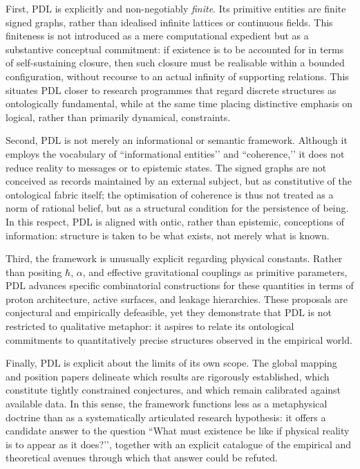 \documentclass{article}
\theoremstyle{definition}
\newcommand{\PDL}{\ensuremath{\mathrm{PDL}}}
\begin{document}
First, \PDL{} is explicitly and non-negotiably \emph{finite}. Its primitive entities are finite signed graphs, rather than idealised infinite lattices or continuous fields.%
\cite{PDL_Main_2026,PDL_Minimal_Closures_2026}
This finiteness is not introduced as a mere computational expedient but as a substantive conceptual commitment: if existence is to be accounted for in terms of self-sustaining closure, then such closure must be realisable within a bounded configuration, without recourse to an actual infinity of supporting relations. This situates \PDL{} closer to research programmes that regard discrete structures as ontologically fundamental, while at the same time placing distinctive emphasis on logical, rather than primarily dynamical, constraints.

Second, \PDL{} is not merely an informational or semantic framework.
Although it employs the vocabulary of “informational entities’’ and “coherence,’’ it does not reduce reality to messages or to epistemic states.
The signed graphs are not conceived as records maintained by an external subject, but as constitutive of the ontological fabric itself; the optimisation of coherence is thus not treated as a norm of rational belief, but as a structural condition for the persistence of being.%
\cite{PDL_Main_2026,PDL_Position_2026}
In this respect, \PDL{} is aligned with ontic, rather than epistemic, conceptions of information: structure is taken to be what exists, not merely what is known.

Third, the framework is unusually explicit regarding physical constants.
Rather than positing \(\hbar\), \(\alpha\), and effective gravitational couplings as primitive parameters, \PDL{} advances specific combinatorial constructions for these quantities in terms of proton architecture, active surfaces, and leakage hierarchies.%
\cite{PDL_Alpha_2026_v2,PDL_Exponent18_2026_Refined,PDL_Effective_Fields_2026}
These proposals are conjectural and empirically defeasible, yet they demonstrate that \PDL{} is not restricted to qualitative metaphor: it aspires to relate its ontological commitments to quantitatively precise structures observed in the empirical world.

Finally, \PDL{} is explicit about the limits of its own scope.
The global mapping and position papers delineate which results are rigorously established, which constitute tightly constrained conjectures, and which remain calibrated against available data.%
\cite{PDL_Position_2026,PDL_Global_Mapping_2026_v3}
In this sense, the framework functions less as a metaphysical doctrine than as a systematically articulated research hypothesis: it offers a candidate answer to the question “What must existence be like if physical reality is to appear as it does?’’, together with an explicit catalogue of the empirical and theoretical avenues through which that answer could be refuted.
\end{document}
